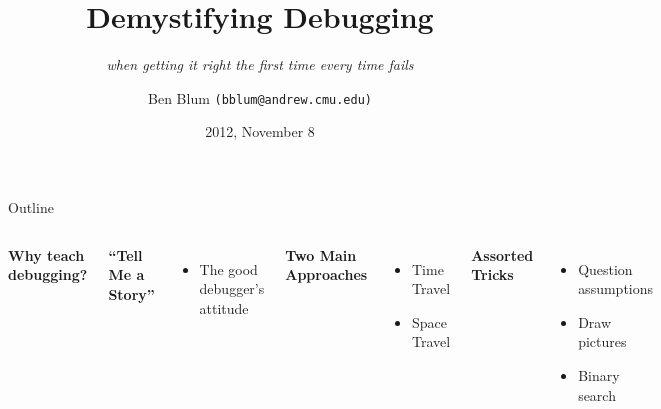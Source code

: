 \documentclass[xcolor=dvipsnames]{beamer}
\title[Demystifying Debugging]{{\bf Demystifying Debugging}}
\subtitle[]{{\em when getting it right the first time every time fails}}
\author[Ben Blum]{Ben Blum \texttt{(bblum@andrew.cmu.edu)}}
\institute[98-172]{Great Practical Ideas for Computer Scientists}
\date[]{2012, November 8}
\begin{document}
\normalem
\begin{frame}
	\titlepage
\end{frame}


\newcommand\linegap{\vspace{0.2in}}
\newcommand\breakslide[1]{\begin{frame}{} \begin{center} \Large #1 \end{center} \end{frame}}
\newcommand\related[1]{\textsuperscript{\em [#1]}}
\newcommand\hilight[2]{\color{#1}#2\color{black}}


\begin{frame}{Outline}
	\begin{columns}[l]
	\textbf{Why teach debugging?}
	\linegap

	\textbf{``Tell Me a Story''}
	\begin{itemize}
		\item The good debugger's attitude
	\end{itemize}
	\linegap

	{\bf Two Main Approaches}
	\begin{itemize}
		\item Time Travel
		\item Space Travel
	\end{itemize}
	\linegap

	{\bf Assorted Tricks}
	\begin{itemize}
		\item Question assumptions
		\item Draw pictures
		\item Binary search
	\end{itemize}
	\end{columns}
\end{frame}
\end{document}
